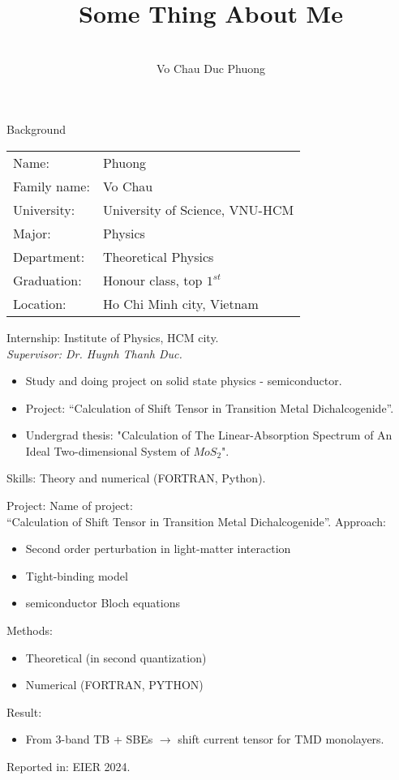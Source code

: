 \documentclass{beamer}
\author[Presenter: VCD Phuong]{\\
	Vo Chau Duc Phuong}
\institute[ICTP]{The Abdus Salam International Center for Theoretical Physics}
\title{Some Thing About Me}
\begin{document}
	\begin{frame}
\maketitle
	\end{frame}
\begin{frame}{Background}
\begin{tabular}{ll}
Name: & Phuong\\
Family name:& Vo Chau\\
University:& University of Science, VNU-HCM\\
Major:& Physics\\
Department:& Theoretical Physics\\
Graduation:& Honour class, top \(1^{st}\)\\
Location:& Ho Chi Minh city, Vietnam
\end{tabular}
\end{frame}
\begin{frame}
Internship: Institute of Physics, HCM city.\\
\textit{Supervisor: Dr. Huynh Thanh Duc.}
\begin{itemize}
\item Study and doing project on solid state physics - semiconductor.\\
\item Project: “Calculation of Shift Tensor in Transition Metal Dichalcogenide”.
\item Undergrad thesis: "Calculation of The Linear-Absorption Spectrum of An Ideal Two-dimensional
System of \(MoS_2\)".
\end{itemize}
Skills: Theory and numerical (FORTRAN, Python).
\end{frame}
\begin{frame}{Project:}
Name of project: \\\quad “Calculation of Shift Tensor in Transition Metal Dichalcogenide”.
Approach:
\begin{itemize}
	\item Second order perturbation in light-matter interaction\\
	\item Tight-binding model\\
	\item semiconductor Bloch equations
\end{itemize}
Methods:
\begin{itemize}
	\item Theoretical (in second quantization)\\
	\item Numerical (FORTRAN, PYTHON)
\end{itemize}
Result:\\
\begin{itemize}
\item From 3-band TB + SBEs \(\to\) shift current tensor for TMD monolayers.
\end{itemize}
Reported in: EIER 2024.
\end{frame}
\end{document}
